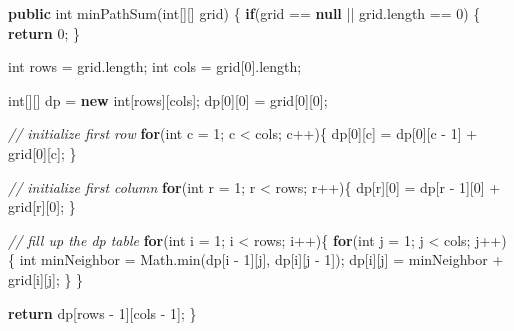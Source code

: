 \documentclass[]{book}
\newenvironment{Shaded}{\begin{snugshade}}{\end{snugshade}}
\newcommand{\BuiltInTok}[1]{#1}
\newcommand{\CommentTok}[1]{\textcolor[rgb]{0.56,0.35,0.01}{\textit{#1}}}
\newcommand{\DataTypeTok}[1]{\textcolor[rgb]{0.13,0.29,0.53}{#1}}
\newcommand{\DecValTok}[1]{\textcolor[rgb]{0.00,0.00,0.81}{#1}}
\newcommand{\FunctionTok}[1]{\textcolor[rgb]{0.00,0.00,0.00}{#1}}
\newcommand{\KeywordTok}[1]{\textcolor[rgb]{0.13,0.29,0.53}{\textbf{#1}}}
\newcommand{\NormalTok}[1]{#1}
\begin{document}
\begin{Shaded}
\begin{Highlighting}[]
\KeywordTok{public} \DataTypeTok{int} \FunctionTok{minPathSum}\NormalTok{(}\DataTypeTok{int}\NormalTok{[][] grid) \{}
    \KeywordTok{if}\NormalTok{(grid == }\KeywordTok{null}\NormalTok{ || grid.}\FunctionTok{length}\NormalTok{ == }\DecValTok{0}\NormalTok{) \{}
        \KeywordTok{return} \DecValTok{0}\NormalTok{;}
\NormalTok{    \}}

    \DataTypeTok{int}\NormalTok{ rows = grid.}\FunctionTok{length}\NormalTok{;}
    \DataTypeTok{int}\NormalTok{ cols = grid[}\DecValTok{0}\NormalTok{].}\FunctionTok{length}\NormalTok{;}

    \DataTypeTok{int}\NormalTok{[][] dp = }\KeywordTok{new} \DataTypeTok{int}\NormalTok{[rows][cols];}
\NormalTok{    dp[}\DecValTok{0}\NormalTok{][}\DecValTok{0}\NormalTok{] = grid[}\DecValTok{0}\NormalTok{][}\DecValTok{0}\NormalTok{];}

    \CommentTok{// initialize first row}
    \KeywordTok{for}\NormalTok{(}\DataTypeTok{int}\NormalTok{ c = }\DecValTok{1}\NormalTok{; c < cols; c++)\{}
\NormalTok{        dp[}\DecValTok{0}\NormalTok{][c] = dp[}\DecValTok{0}\NormalTok{][c - }\DecValTok{1}\NormalTok{] + grid[}\DecValTok{0}\NormalTok{][c];}
\NormalTok{    \}}

    \CommentTok{// initialize first column}
    \KeywordTok{for}\NormalTok{(}\DataTypeTok{int}\NormalTok{ r = }\DecValTok{1}\NormalTok{; r < rows; r++)\{}
\NormalTok{        dp[r][}\DecValTok{0}\NormalTok{] = dp[r - }\DecValTok{1}\NormalTok{][}\DecValTok{0}\NormalTok{] + grid[r][}\DecValTok{0}\NormalTok{];}
\NormalTok{    \}}

    \CommentTok{// fill up the dp table}
    \KeywordTok{for}\NormalTok{(}\DataTypeTok{int}\NormalTok{ i = }\DecValTok{1}\NormalTok{; i < rows; i++)\{}
        \KeywordTok{for}\NormalTok{(}\DataTypeTok{int}\NormalTok{ j = }\DecValTok{1}\NormalTok{; j < cols; j++)\{}
            \DataTypeTok{int}\NormalTok{ minNeighbor = }\BuiltInTok{Math}\NormalTok{.}\FunctionTok{min}\NormalTok{(dp[i - }\DecValTok{1}\NormalTok{][j], dp[i][j - }\DecValTok{1}\NormalTok{]);}
\NormalTok{            dp[i][j] = minNeighbor + grid[i][j];}
\NormalTok{        \}}
\NormalTok{    \}}

    \KeywordTok{return}\NormalTok{ dp[rows - }\DecValTok{1}\NormalTok{][cols - }\DecValTok{1}\NormalTok{];}
\NormalTok{\}}
\end{Highlighting}
\end{Shaded}
\end{document}
